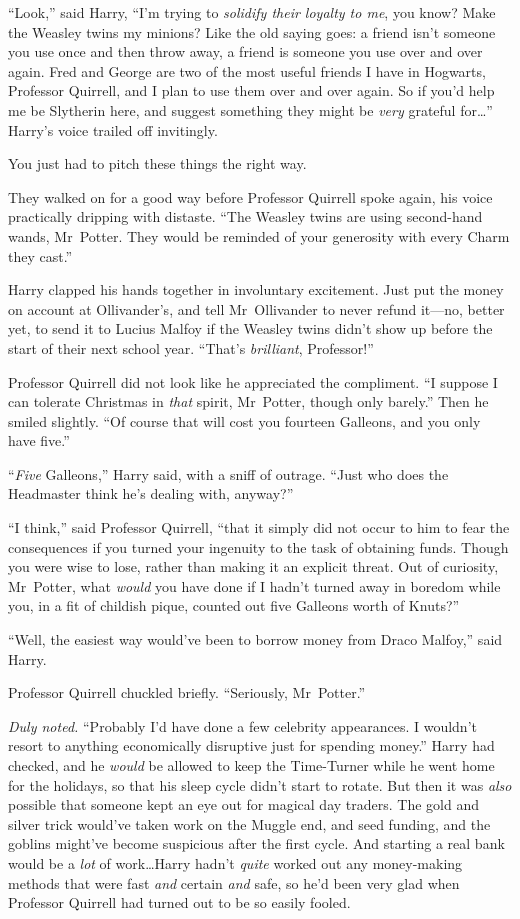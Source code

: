 “Look,” said Harry,
“I’m trying to \emph{solidify their loyalty to me}, you know? Make the Weasley twins my minions? Like the old saying goes: a friend isn’t someone you use once and then throw away, a friend is someone you use over and over again. Fred and George are two of the most useful friends I have in Hogwarts, Professor Quirrell, and I plan to use them over and over again. So if you’d help me be Slytherin here, and suggest something they might be \emph{very} grateful for…” Harry’s voice trailed off invitingly.

You just had to pitch these things the right way.

They walked on for a good way before Professor Quirrell spoke again, his voice practically dripping with distaste.
“The Weasley twins are using second-hand wands, Mr~Potter. They would be reminded of your generosity with every Charm they cast.”

Harry clapped his hands together in involuntary excitement. Just put the money on account at Ollivander’s, and tell Mr~Ollivander to never refund it—no, better yet, to send it to Lucius Malfoy if the Weasley twins didn’t show up before the start of their next school year.
“That’s \emph{brilliant}, Professor!”

Professor Quirrell did not look like he appreciated the compliment.
“I suppose I can tolerate Christmas in \emph{that} spirit, Mr~Potter, though only barely.” Then he smiled slightly.
“Of course that will cost you fourteen Galleons, and you only have five.”

“\emph{Five} Galleons,” Harry said, with a sniff of outrage.
“Just who does the Headmaster think he’s dealing with, anyway?”

“I think,” said Professor Quirrell, “that it simply did not occur to him to fear the consequences if you turned your ingenuity to the task of obtaining funds. Though you were wise to lose, rather than making it an explicit threat. Out of curiosity, Mr~Potter, what \emph{would} you have done if I hadn’t turned away in boredom while you, in a fit of childish pique, counted out five Galleons worth of Knuts?”

“Well, the easiest way would’ve been to borrow money from Draco Malfoy,” said Harry.

Professor Quirrell chuckled briefly.
“Seriously, Mr~Potter.”

\emph{Duly noted.}
“Probably I’d have done a few celebrity appearances. I wouldn’t resort to anything economically disruptive just for spending money.” Harry had checked, and he \emph{would} be allowed to keep the Time-Turner while he went home for the holidays, so that his sleep cycle didn’t start to rotate. But then it was \emph{also} possible that someone kept an eye out for magical day traders. The gold and silver trick would’ve taken work on the Muggle end, and seed funding, and the goblins might’ve become suspicious after the first cycle. And starting a real bank would be a \emph{lot} of work…Harry hadn’t \emph{quite} worked out any money-making methods that were fast \emph{and} certain \emph{and} safe, so he’d been very glad when Professor Quirrell had turned out to be so easily fooled.


